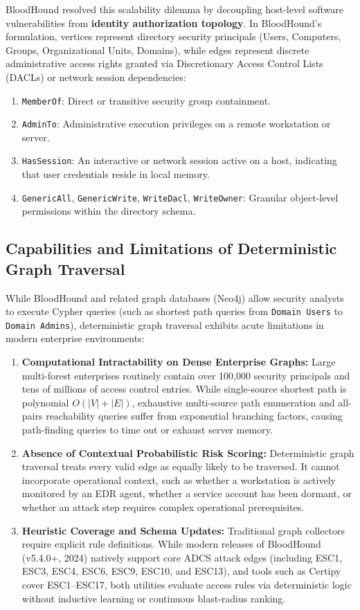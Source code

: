 BloodHound resolved this scalability dilemma by decoupling host-level software vulnerabilities from \textbf{identity authorization topology}. In BloodHound's formulation, vertices represent directory security principals (Users, Computers, Groups, Organizational Units, Domains), while edges represent discrete administrative access rights granted via Discretionary Access Control Lists (DACLs) or network session dependencies:
\begin{enumerate}
    \item \texttt{MemberOf}: Direct or transitive security group containment.
    \item \texttt{AdminTo}: Administrative execution privileges on a remote workstation or server.
    \item \texttt{HasSession}: An interactive or network session active on a host, indicating that user credentials reside in local memory.
    \item \texttt{GenericAll}, \texttt{GenericWrite}, \texttt{WriteDacl}, \texttt{WriteOwner}: Granular object-level permissions within the directory schema.
\end{enumerate}

\subsection{Capabilities and Limitations of Deterministic Graph Traversal}
While BloodHound and related graph databases (Neo4j) allow security analysts to execute Cypher queries (such as shortest path queries from \texttt{Domain Users} to \texttt{Domain Admins}), deterministic graph traversal exhibits acute limitations in modern enterprise environments:
\begin{enumerate}
    \item \textbf{Computational Intractability on Dense Enterprise Graphs:} Large multi-forest enterprises routinely contain over 100,000 security principals and tens of millions of access control entries. While single-source shortest path is polynomial $O(|V| + |E|)$, exhaustive multi-source path enumeration and all-pairs reachability queries suffer from exponential branching factors, causing path-finding queries to time out or exhaust server memory.
    \item \textbf{Absence of Contextual Probabilistic Risk Scoring:} Deterministic graph traversal treats every valid edge as equally likely to be traversed. It cannot incorporate operational context, such as whether a workstation is actively monitored by an EDR agent, whether a service account has been dormant, or whether an attack step requires complex operational prerequisites.
    \item \textbf{Heuristic Coverage and Schema Updates:} Traditional graph collectors require explicit rule definitions. While modern releases of BloodHound (v5.4.0+, 2024) natively support core ADCS attack edges (including ESC1, ESC3, ESC4, ESC6, ESC9, ESC10, and ESC13), and tools such as Certipy~\cite{lyak2021certipy} cover ESC1--ESC17, both utilities evaluate access rules via deterministic logic without inductive learning or continuous blast-radius ranking.
\end{enumerate}

